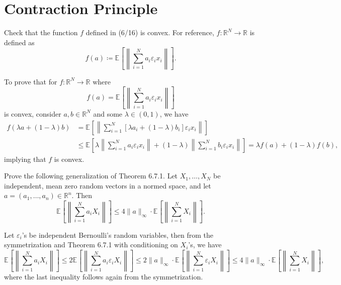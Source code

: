\section{Contraction Principle}

\begin{problem*}[Exercise 6.7.2]\label{ex6.7.2}
	Check that the function \(f\) defined in (6/16) is convex. For reference, \(f\colon \mathbb{R} ^N \to \mathbb{R} \) is defined as
	\[
		f(a)
		\coloneqq \mathbb{E}_{}\left[\left\lVert \sum_{i=1}^{N} a_i \varepsilon _i x_i \right\rVert \right] .
	\]
\end{problem*}
\begin{answer}
	To prove that for \(f \colon \mathbb{R} ^N \to \mathbb{R} \) where
	\[
		f(a)
		= \mathbb{E}_{}\left[\left\lVert \sum_{i=1}^{N} a_i \varepsilon _i x_i \right\rVert \right]
	\]
	is convex, consider \(a, b \in \mathbb{R} ^N\) and some \(\lambda \in (0, 1)\), we have
	\[
		\begin{split}
			f(\lambda a + (1 - \lambda )b)
			 & = \mathbb{E}_{}\left[\left\lVert \sum_{i=1}^{N} \left[ \lambda a_i + (1 - \lambda ) b_i \right] \varepsilon _i x_i \right\rVert \right]                                                 \\
			 & \leq \mathbb{E}_{}\left[\lambda \left\lVert \sum_{i=1}^{N} a_i \varepsilon _i x_i \right\rVert + (1 - \lambda ) \left\lVert \sum_{i=1}^{N} b_i \varepsilon _i x_i \right\rVert  \right]
			= \lambda f(a) + (1 - \lambda ) f(b),
		\end{split}
	\]
	implying that \(f\) is convex.
\end{answer}

\begin{problem*}[Exercise 6.7.3]\label{ex6.7.3}
	Prove the following generalization of Theorem 6.7.1. Let \(X_1, \dots , X_N\) be independent, mean zero random vectors in a normed space, and let \(a = (a_1, \dots, a_n) \in \mathbb{R} ^n\). Then
	\[
		\mathbb{E}_{}\left[\left\lVert \sum_{i=1}^{N} a_i X_i \right\rVert \right]
		\leq 4 \lVert a \rVert _\infty \cdot \mathbb{E}_{}\left[\left\lVert \sum_{i=1}^{N} X_i \right\rVert \right] .
	\]
\end{problem*}
\begin{answer}
	Let \(\varepsilon _i\)'s be independent Bernoulli's random variables, then from the symmetrization and Theorem 6.7.1 with conditioning on \(X_i\)'s, we have
	\[
		\mathbb{E}_{}\left[\left\lVert \sum_{i=1}^{N} a_i X_i \right\rVert \right]
		\leq 2 \mathbb{E}_{}\left[\left\lVert \sum_{i=1}^{N} a_i \varepsilon _i X_i \right\rVert \right]
		\leq 2 \lVert a \rVert _\infty \cdot \mathbb{E}_{}\left[\left\lVert \sum_{i=1}^{N} \varepsilon _i X_i \right\rVert \right]
		\leq 4 \lVert a \rVert _\infty \cdot \mathbb{E}_{}\left[\left\lVert \sum_{i=1}^{N} X_i \right\rVert \right],
	\]
	where the last inequality follows again from the symmetrization.
\end{answer}

